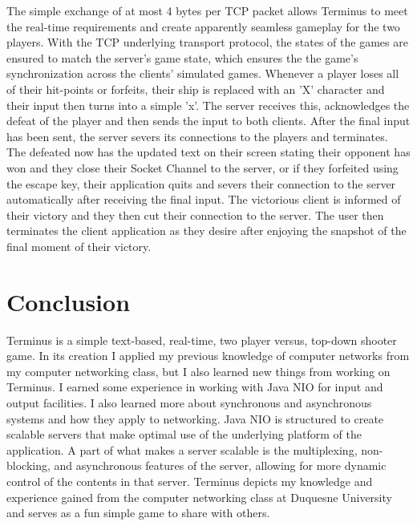 \documentclass[12pt]{article}
\begin{document}
    The simple exchange of at most 4 bytes per TCP packet allows Terminus to meet the real-time requirements and create apparently seamless gameplay for the two players. With the TCP underlying transport protocol, the states of the games are ensured to match the server's game state, which ensures the the game's synchronization across the clients' simulated games. Whenever a player loses all of their hit-points or forfeits, their ship is replaced with an 'X' character and their input then turns into a simple 'x'. The server receives this, acknowledges the defeat of the player and then sends the input to both clients. After the final input has been sent, the server severs its connections to the players and terminates. The defeated now has the updated text on their screen stating their opponent has won and they close their Socket Channel to the server, or if they forfeited using the escape key, their application quits and severs their connection to the server automatically after receiving the final input. The victorious client is informed of their victory and they then cut their connection to the server. The user then terminates the client application as they desire after enjoying the snapshot of the final moment of their victory.

\section{Conclusion}
    Terminus is a simple text-based, real-time, two player versus, top-down shooter game. In its creation I applied my previous knowledge of computer networks from my computer networking class, but I also learned new things from working on Terminus. I earned some experience in working with Java NIO for input and output facilities. I also learned more about synchronous and asynchronous systems and how they apply to networking. Java NIO is structured to create scalable servers that make optimal use of the underlying platform of the application. A part of what makes a server scalable is the multiplexing, non-blocking, and asynchronous features of the server, allowing for more dynamic control of the contents in that server. Terminus depicts my knowledge and experience gained from the computer networking class at Duquesne University and serves as a fun simple game to share with others.
    
\end{document}
